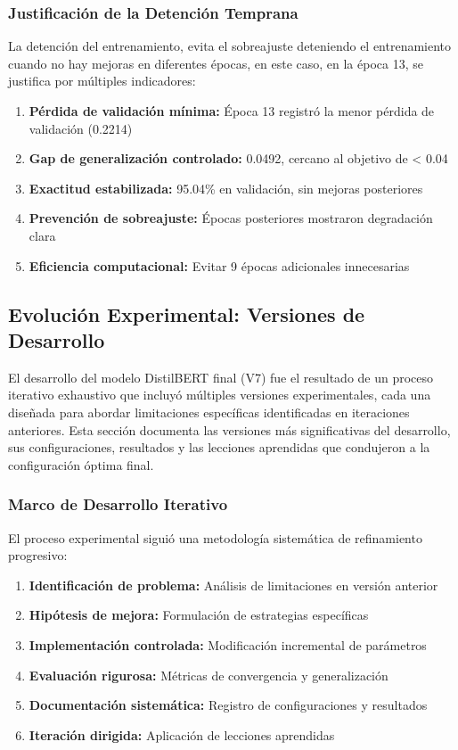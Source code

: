 \subsubsection{Justificación de la Detención Temprana}

La detención del entrenamiento, evita el sobreajuste deteniendo el entrenamiento cuando no hay mejoras en diferentes épocas, en este caso, en la época 13, se justifica por múltiples indicadores:

\begin{enumerate}
    \item \textbf{Pérdida de validación mínima:} Época 13 registró la menor pérdida de validación (0.2214)
    \item \textbf{Gap de generalización controlado:} 0.0492, cercano al objetivo de < 0.04
    \item \textbf{Exactitud estabilizada:} 95.04\% en validación, sin mejoras posteriores
    \item \textbf{Prevención de sobreajuste:} Épocas posteriores mostraron degradación clara
    \item \textbf{Eficiencia computacional:} Evitar 9 épocas adicionales innecesarias
\end{enumerate}

\subsection{Evolución Experimental: Versiones de Desarrollo}
\label{subsec:evolucion_experimental_distilbert}

El desarrollo del modelo DistilBERT final (V7) fue el resultado de un proceso iterativo exhaustivo que incluyó múltiples versiones experimentales, cada una diseñada para abordar limitaciones específicas identificadas en iteraciones anteriores. Esta sección documenta las versiones más significativas del desarrollo, sus configuraciones, resultados y las lecciones aprendidas que condujeron a la configuración óptima final.

\subsubsection{Marco de Desarrollo Iterativo}

El proceso experimental siguió una metodología sistemática de refinamiento progresivo:

\begin{enumerate}
    \item \textbf{Identificación de problema:} Análisis de limitaciones en versión anterior
    \item \textbf{Hipótesis de mejora:} Formulación de estrategias específicas
    \item \textbf{Implementación controlada:} Modificación incremental de parámetros
    \item \textbf{Evaluación rigurosa:} Métricas de convergencia y generalización
    \item \textbf{Documentación sistemática:} Registro de configuraciones y resultados
    \item \textbf{Iteración dirigida:} Aplicación de lecciones aprendidas
\end{enumerate}

